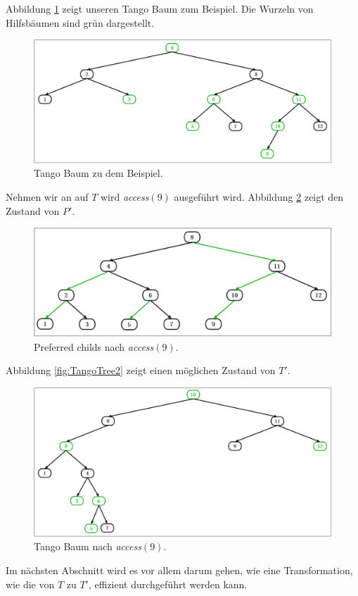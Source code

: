 \documentclass[a4paper,12pt]{article}
\begin{document}
\noindent Abbildung \ref{fig:Tangobaum} zeigt unseren Tango Baum zum Beispiel. Die Wurzeln von Hilfsbäumen sind grün dargestellt.

\begin{figure}[h]
	\centering
	\includegraphics[width=1\textwidth]{"Medien/Tango/Tangobaum"}
	\caption{Tango Baum zu dem Beispiel. }
	\label{fig:Tangobaum}
\end{figure}
Nehmen wir an auf $T$ wird \textit{access}$\left(9\right)$ ausgeführt wird. Abbildung \ref{fig:prefChilds2} zeigt den Zustand von $P'$.

\begin{figure}[h]
	\centering
	\includegraphics[width=1\textwidth]{"Medien/Tango/prefChilds2"}
	\caption{Preferred childs nach  \textit{access}$\left(9\right)$. }
	\label{fig:prefChilds2}
\end{figure}

Abbildung \ref{fig:TangoTree2} zeigt einen möglichen Zustand von $T'$.
\begin{figure}[h]
	\centering
	\includegraphics[width=1\textwidth]{"Medien/Tango/Tangobaum2"}
	\caption{Tango Baum nach  \textit{access}$\left(9\right)$. }
	\label{fig:Tangobaum2}
\end{figure}
Im nächsten Abschnitt wird es vor allem darum gehen, wie eine Transformation, wie die von $T$ zu $T'$, effizient durchgeführt werden kann.
\end{document}
